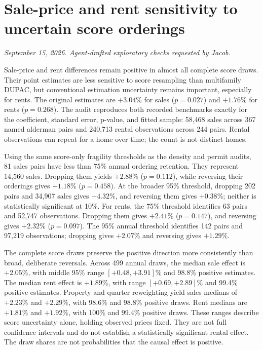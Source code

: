 \clearpage
\section*{Sale-price and rent sensitivity to uncertain score orderings}
\textit{September 15, 2026. Agent-drafted exploratory checks requested by Jacob.}

Sale-price and rent differences remain positive in almost all complete score
draws. Their point estimates are less sensitive to score resampling than
multifamily DUPAC, but conventional estimation uncertainty remains important,
especially for rents. The original estimates are $+3.04\%$ for sales
($p=0.027$) and $+1.76\%$ for rents ($p=0.268$). The audit reproduces both
recorded benchmarks exactly for the coefficient, standard error, p-value,
and fitted sample: 58,468 sales across 367 named alderman pairs and 240,713
rental observations across 244 pairs. Rental observations can repeat for a
home over time; the count is not distinct homes.

Using the same score-only fragility thresholds as the density and permit
audits, 81 sales pairs have less than 75\% annual ordering retention. They
represent 14,560 sales. Dropping them yields $+2.88\%$ ($p=0.112$), while
reversing their orderings gives $+1.18\%$ ($p=0.458$). At the broader 95\%
threshold, dropping 202 pairs and 34,907 sales gives $+4.32\%$, and
reversing them gives $+0.38\%$; neither is statistically significant at 10\%.
For rents, the 75\% threshold identifies 63 pairs and 52,747 observations.
Dropping them gives $+2.41\%$ ($p=0.147$), and reversing gives $+2.32\%$
($p=0.097$). The 95\% annual threshold identifies 142 pairs and 97,219
observations; dropping gives $+2.07\%$ and reversing gives $+1.29\%$.

The complete score draws preserve the positive direction more consistently
than broad, deliberate reversals. Across 499 annual draws, the median sale
effect is $+2.05\%$, with middle 95\% range $[+0.48,+3.91]\%$ and 98.8\%
positive estimates. The median rent effect is $+1.89\%$, with range
$[+0.69,+2.89]\%$ and 99.4\% positive estimates. Property and quarter
reweighting yield sales medians of $+2.23\%$ and $+2.29\%$, with 98.6\%
and 98.8\% positive draws. Rent medians are $+1.81\%$ and $+1.92\%$, with
100\% and 99.4\% positive draws. These ranges describe score uncertainty
alone, holding observed prices fixed. They are not full confidence intervals
and do not establish a statistically significant rental effect. The draw
shares are not probabilities that the causal effect is positive.

